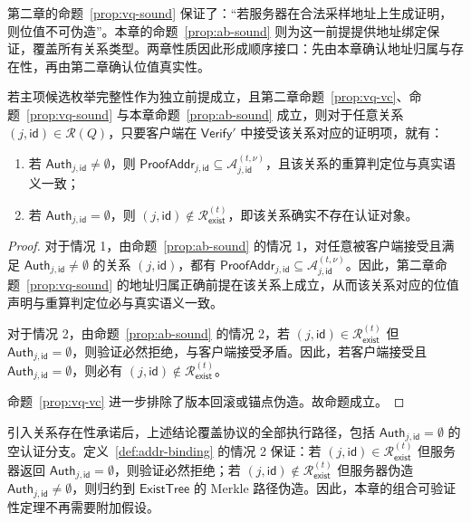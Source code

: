 第二章的命题~\ref{prop:vq-sound} 保证了：``若服务器在合法采样地址上生成证明，则位值不可伪造''。本章的命题~\ref{prop:ab-sound} 则为这一前提提供地址绑定保证，覆盖所有关系类型。两章性质因此形成顺序接口：先由本章确认地址归属与存在性，再由第二章确认位值真实性。

\begin{proposition}[组合可验证性接口]\label{prop:cv}
若主项候选枚举完整性作为独立前提成立，且第二章命题~\ref{prop:vq-vc}、命题~\ref{prop:vq-sound} 与本章命题~\ref{prop:ab-sound} 成立，则对于任意关系 $(j,\mathsf{id})\in\mathcal{R}(Q)$，只要客户端在 $\mathsf{Verify}'$ 中接受该关系对应的证明项，就有：
\begin{enumerate}
\item 若 $\mathsf{Auth}_{j,\mathsf{id}}\neq\emptyset$，则 $\mathsf{ProofAddr}_{j,\mathsf{id}}\subseteq\mathcal{A}_{j,\mathsf{id}}^{(t,\nu)}$，且该关系的重算判定位与真实语义一致；
\item 若 $\mathsf{Auth}_{j,\mathsf{id}}=\emptyset$，则 $(j,\mathsf{id})\notin\mathcal{R}_{\mathsf{exist}}^{(t)}$，即该关系确实不存在认证对象。
\end{enumerate}
\end{proposition}

\begin{proof}
对于情况 1，由命题~\ref{prop:ab-sound} 的情况 1，对任意被客户端接受且满足 $\mathsf{Auth}_{j,\mathsf{id}}\neq\emptyset$ 的关系 $(j,\mathsf{id})$，都有 $\mathsf{ProofAddr}_{j,\mathsf{id}}\subseteq\mathcal{A}_{j,\mathsf{id}}^{(t,\nu)}$。因此，第二章命题~\ref{prop:vq-sound} 的地址归属正确前提在该关系上成立，从而该关系对应的位值声明与重算判定位必与真实语义一致。

对于情况 2，由命题~\ref{prop:ab-sound} 的情况 2，若 $(j,\mathsf{id})\in\mathcal{R}_{\mathsf{exist}}^{(t)}$ 但 $\mathsf{Auth}_{j,\mathsf{id}}=\emptyset$，则验证必然拒绝，与客户端接受矛盾。因此，若客户端接受且 $\mathsf{Auth}_{j,\mathsf{id}}=\emptyset$，则必有 $(j,\mathsf{id})\notin\mathcal{R}_{\mathsf{exist}}^{(t)}$。

命题~\ref{prop:vq-vc} 进一步排除了版本回滚或锚点伪造。故命题成立。
\end{proof}

引入关系存在性承诺后，上述结论覆盖协议的全部执行路径，包括 $\mathsf{Auth}_{j,\mathsf{id}}=\emptyset$ 的空认证分支。定义~\ref{def:addr-binding} 的情况 2 保证：若 $(j,\mathsf{id})\in\mathcal{R}_{\mathsf{exist}}^{(t)}$ 但服务器返回 $\mathsf{Auth}_{j,\mathsf{id}}=\emptyset$，则验证必然拒绝；若 $(j,\mathsf{id})\notin\mathcal{R}_{\mathsf{exist}}^{(t)}$ 但服务器伪造 $\mathsf{Auth}_{j,\mathsf{id}}\neq\emptyset$，则归约到 $\mathsf{ExistTree}$ 的 Merkle 路径伪造。因此，本章的组合可验证性定理不再需要附加假设。


